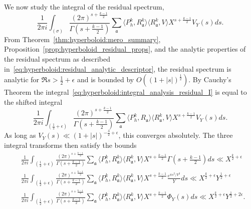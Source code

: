 We now study the integral of the residual spectrum,
\begin{equation}\label{eq:hyperboloid:integral_analysis_residual_I}
  \frac{1}{2\pi i} \int_{(\sigma)} \frac{(2\pi)^{s + \frac{k-1}{2}}}{\Gamma(s +
    \frac{k-1}{2})} \sum_\mathfrak{a} \langle P_h^k, R^k_\mathfrak{a}\rangle \langle
  R^k_\mathfrak{a}, V \rangle X^{s + \frac{k-1}{2}} V_Y(s) ds.
\end{equation}
From Theorem~\ref{thm:hyperboloid:mero_summary},
Proposition~\ref{prop:hyperboloid_residual_props}, and the analytic properties of the
residual spectrum as described in~\eqref{eq:hyperboloid:residual_analytic_descriptor}, the
residual spectrum is analytic for $\Re s > \frac{1}{2} + \epsilon$ and is bounded by $O((1
+ \lvert s \rvert)^{\frac{1}{2}})$.
By Cauchy's Theorem the integral~\eqref{eq:hyperboloid:integral_analysis_residual_I} is
equal to the shifted integral
\begin{equation}
  \frac{1}{2\pi i} \int_{(\frac{1}{2} + \epsilon)} \frac{(2\pi)^{s +
  \frac{k-1}{2}}}{\Gamma(s + \frac{k-1}{2})} \sum_\mathfrak{a} \langle P_h^k,
  R_\mathfrak{a}\rangle \langle R^k_\mathfrak{a}, V \rangle X^{s + \frac{k-1}{2}} V_Y(s) ds.
\end{equation}
As long as $V_Y(s) \ll (1 + \lvert s \rvert)^{-\frac{3}{2} + \epsilon}$, this converges
absolutely.
The three integral transforms then satisfy the bounds
\begin{align}
  &\frac{1}{2\pi i} \int_{(\frac{1}{2} + \epsilon)} \frac{(2\pi)^{s +
  \frac{k-1}{2}}}{\Gamma(s + \frac{k-1}{2})} \sum_\mathfrak{a} \langle P_h^k,
    R^k_\mathfrak{a}\rangle \langle R^k_\mathfrak{a}, V \rangle X^{s + \frac{k-1}{2}} \Gamma(s
    + \tfrac{k-1}{2}) ds \ll X^{\frac{k}{2} + \epsilon}
  \label{eq:hyperboloid:residual_gamma_integral_bound} \\
  &\frac{1}{2\pi i} \int_{(\frac{1}{2} + \epsilon)} \frac{(2\pi)^{s +
  \frac{k-1}{2}}}{\Gamma(s + \frac{k-1}{2})} \sum_\mathfrak{a} \langle P_h^k,
  R^k_\mathfrak{a}\rangle \langle R^k_\mathfrak{a}, V \rangle X^{s + \frac{k-1}{2}}
  \frac{e^{\pi s^2/Y^2}}{Y} ds \ll X^{\frac{k}{2} + \epsilon} Y^{\frac{1}{2} + \epsilon}
  \label{eq:hyperboloid:residual_concentrating_integral_bound} \\
  &\frac{1}{2\pi i} \int_{(\frac{1}{2} + \epsilon)} \frac{(2\pi)^{s +
  \frac{k-1}{2}}}{\Gamma(s + \frac{k-1}{2})} \sum_\mathfrak{a} \langle P_h^k,
  R^k_\mathfrak{a}\rangle \langle R^k_\mathfrak{a}, V \rangle X^{s + \frac{k-1}{2}} \Phi_Y(s)
  ds \ll X^{\frac{k}{2} + \epsilon} Y^{\frac{1}{2} + 2\epsilon}.
  \label{eq:hyperboloid:residual_compact_integral_bound}
\end{align}



